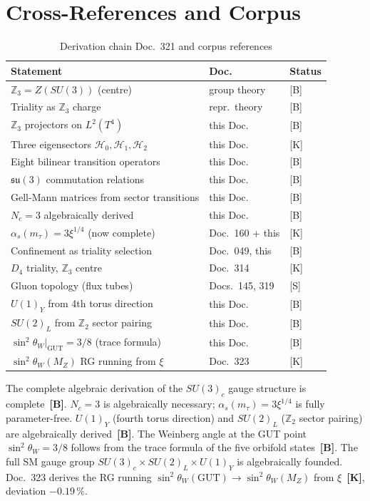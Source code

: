 \section{Cross-References and Corpus}

\begin{table}[h]
\centering
\caption{Derivation chain Doc.~321 and corpus references}
\label{tab:corpus}
\begin{tabular}{lll}
\toprule
Statement & Doc. & Status \\
\midrule
$\mathbb{Z}_3 = Z(SU(3))$ (centre) & group theory & [B] \\
Triality as $\mathbb{Z}_3$ charge & repr.\ theory & [B] \\
$\mathbb{Z}_3$ projectors on $L^2(T^4)$ & this Doc. & [B] \\
Three eigensectors $\mathcal{H}_0,\mathcal{H}_1,\mathcal{H}_2$ & this Doc. & [K] \\
Eight bilinear transition operators & this Doc. & [B] \\
$\mathfrak{su}(3)$ commutation relations & this Doc. & [B] \\
Gell-Mann matrices from sector transitions & this Doc. & [B] \\
$N_c=3$ algebraically derived & this Doc. & [B] \\
$\alpha_s(m_\tau)=3\xi^{1/4}$ (now complete) & Doc.~160 + this & [K] \\
Confinement as triality selection & Doc.~049, this & [B] \\
$D_4$ triality, $\mathbb{Z}_3$ centre & Doc.~314 & [K] \\
Gluon topology (flux tubes) & Docs.~145, 319 & [S] \\
$U(1)_Y$ from 4th torus direction & this Doc. & [B] \\
$SU(2)_L$ from $\mathbb{Z}_2$ sector pairing & this Doc. & [B] \\
$\sin^2\theta_W|_{\mathrm{GUT}}=3/8$ (trace formula) & this Doc. & [B] \\
$\sin^2\theta_W(M_Z)$ RG running from $\xi$ & Doc.~323 & [K] \\
\bottomrule
\end{tabular}
\end{table}

\begin{keyresult}
The complete algebraic derivation of the $SU(3)_c$ gauge structure
is complete~\textbf{[B]}. $N_c=3$ is algebraically necessary;
$\alpha_s(m_\tau)=3\xi^{1/4}$ is fully parameter-free.
$U(1)_Y$ (fourth torus direction) and $SU(2)_L$
($\mathbb{Z}_2$ sector pairing) are algebraically derived~\textbf{[B]}.
The Weinberg angle at the GUT point $\sin^2\theta_W=3/8$ follows
from the trace formula of the five orbifold states~\textbf{[B]}.
The full SM gauge group $SU(3)_c\times SU(2)_L\times U(1)_Y$ is
algebraically founded. Doc.~323 derives the RG running
$\sin^2\theta_W(\mathrm{GUT})\to\sin^2\theta_W(M_Z)$ from $\xi$~\textbf{[K]},
deviation $-0.19\,\%$.
\end{keyresult}
